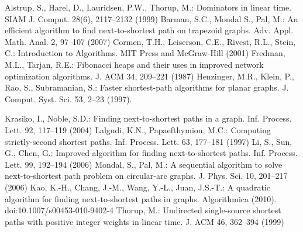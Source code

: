 \begin{thebibliography}{99}
Alstrup, S., Harel, D., Lauridsen, P.W., Thorup, M.: Dominators in linear time. SIAM J. Comput. 28(6), 2117--2132 (1999)
Barman, S.C., Mondal S., Pal, M.: An efficient algorithm to find next-to-shortest path on trapezoid
graphs. Adv. Appl. Math. Anal. 2, 97--107 (2007)
Cormen, T.H., Leiserson, C.E., Rivest, R.L., Stein, C.: Introduction to Algorithms. MIT Press and McGraw-Hill (2001) 
Fredman, M.L., Tarjan, R.E.: Fibonacci heaps and their uses in improved
network optimization algorithms. J. ACM 34, 209--221 (1987) 
Henzinger, M.R., Klein, P., Rao, S., Subramanian, S.: Faster shortest-path algorithms for planar graphs. J. Comput. Syst. Sci. 53, 2--23 (1997). 

Krasiko, I., Noble, S.D.: Finding next-to-shortest paths in a graph. Inf. Process. Lett. 92, 117--119 (2004)
Lalgudi, K.N., Papaefthymiou, M.C.: Computing strictly-second shortest paths. Inf. Process. Lett. 63, 177--181 (1997)
Li, S., Sun, G., Chen, G.: Improved algorithm for finding next-to-shortest paths. Inf. Process. Lett.  99, 192--194 (2006)
Mondal, S., Pal, M.: A sequential algorithm to solve next-to-shortest path problem on circular-arc graphs. J. Phys. Sci. 10, 201--217 (2006)
Kao, K.-H., Chang, J.-M., Wang, Y.-L., Juan, J.S.-T.: A quadratic algorithm for finding next-to-shortest paths in graphs. Algorithmica (2010). doi:10.1007/s00453-010-9402-4 
Thorup, M.: Undirected single-source shortest paths with positive integer weights in linear time. J. ACM 46, 362--394 (1999)

\end{thebibliography}


